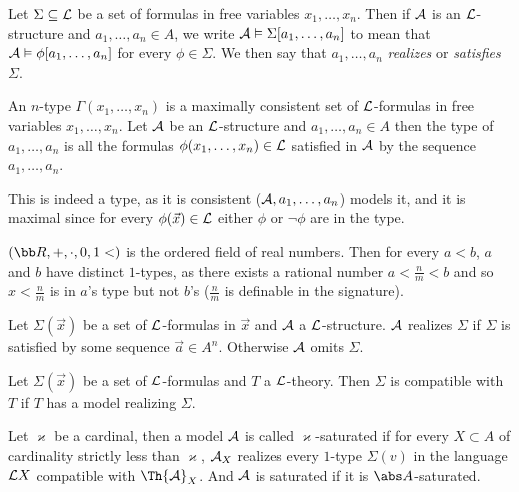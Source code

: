 Let $\Sigma\subseteq{\cal L}$ be a set of formulas in free variables $x_1,\dots,x_n$.
Then if ${\cal A}$ is an ${\cal L}$-structure and $a_1,\dots,a_n\in A$, we write ${\cal A}\vDash\Sigma[a_1,\dots,a_n]$ to mean that ${\cal A}\vDash\phi[a_1,\dots,a_n]$ for every $\phi\in\Sigma$.
We then say that $a_1,\dots,a_n$ {\it realizes} or {\it satisfies} $\Sigma$.

\bdefn

    An {\emphcolor $n$-type} $\Gamma(x_1,\dots,x_n)$ is a maximally consistent set of ${\cal L}$-formulas in free variables $x_1,\dots,x_n$.
    Let ${\cal A}$ be an ${\cal L}$-structure and $a_1,\dots,a_n\in A$ then the {\emphcolor type} of $a_1,\dots,a_n$ is all the formulas $\phi(x_1,\dots,x_n)\in{\cal L}$ satisfied in ${\cal A}$ by the
    sequence $a_1,\dots,a_n$.

\edefn

This is indeed a type, as it is consistent (${\cal A},a_1,\dots,a_n$) models it, and it is maximal since for every $\phi(\vec x)\in{\cal L}$ either $\phi$ or $\neg\phi$ are in the type.

\bexam

    $({\bb R},+,\cdot,0,1<)$ is the ordered field of real numbers.
    Then for every $a<b$, $a$ and $b$ have distinct $1$-types, as there exists a rational number $a<\frac nm<b$ and so $x<\frac nm$ is in $a$'s type but not $b$'s ($\frac nm$ is definable in the signature).

\eexam

\bdefn

    Let $\Sigma(\vec x)$ be a set of ${\cal L}$-formulas in $\vec x$ and ${\cal A}$ a ${\cal L}$-structure.
    ${\cal A}$ {\emphcolor realizes} $\Sigma$ if $\Sigma$ is satisfied by some sequence $\vec a\in A^n$.
    Otherwise ${\cal A}$ {\emphcolor omits} $\Sigma$.

\edefn

\bdefn

    Let $\Sigma(\vec x)$ be a set of ${\cal L}$-formulas and $T$ a ${\cal L}$-theory.
    Then $\Sigma$ is {\emphcolor compatible} with $T$ if $T$ has a model realizing $\Sigma$.

\edefn

\bdefn

    Let $\varkappa$ be a cardinal, then a model ${\cal A}$ is called {\emphcolor $\varkappa$-saturated} if for every $X\subset A$ of cardinality strictly less than $\varkappa$, ${\cal A}_X$ realizes every
    $1$-type $\Sigma(v)$ in the language ${\cal L}X$ compatible with $\Th{\cal A}_X$.
    And ${\cal A}$ is {\emphcolor saturated} if it is $\abs A$-saturated.

